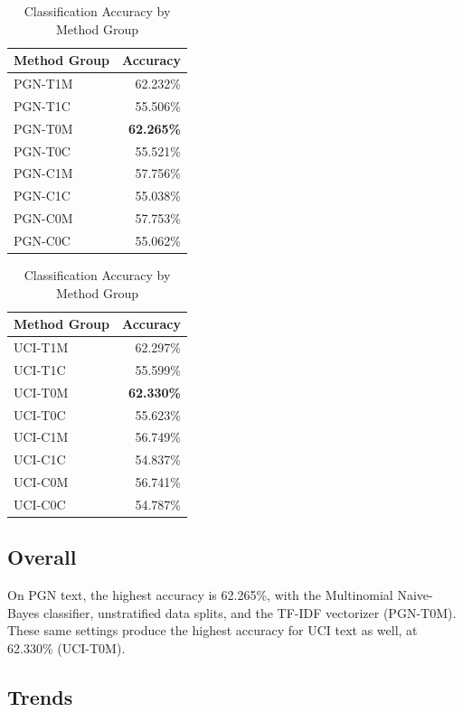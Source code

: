 \documentclass[conference]{IEEEtran}
\begin{document}
\begin{table}[]
\caption{Classification Accuracy by Method Group}
\centering
\begin{tabular}{lr}
\hline\hline
Method Group & Accuracy \\ [0.5ex]
\hline
PGN-T1M & 62.232\% \\
PGN-T1C & 55.506\% \\
PGN-T0M & \textbf{62.265\%} \\
PGN-T0C & 55.521\% \\
PGN-C1M & 57.756\% \\
PGN-C1C & 55.038\% \\
PGN-C0M & 57.753\% \\
PGN-C0C & 55.062\% \\ [1ex]
\hline
\end{tabular}
\begin{tabular}{lr}
\hline\hline
Method Group & Accuracy \\ [0.5ex]
\hline
UCI-T1M & 62.297\% \\
UCI-T1C & 55.599\% \\
UCI-T0M & \textbf{62.330\%} \\
UCI-T0C & 55.623\% \\
UCI-C1M & 56.749\% \\
UCI-C1C & 54.837\% \\
UCI-C0M & 56.741\% \\
UCI-C0C & 54.787\% \\ [1ex]
\hline
\end{tabular}
\label{class-results}
\end{table}

\subsection{Overall}

On PGN text, the highest accuracy is 62.265\%, with the Multinomial Naive-Bayes classifier, unstratified data splits, and the TF-IDF vectorizer (PGN-T0M). These same settings produce the highest accuracy for UCI text as well, at 62.330\% (UCI-T0M).

\subsection{Trends}
\end{document}
